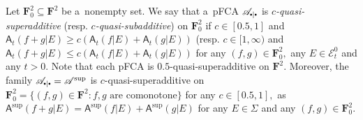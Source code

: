 \documentclass[preprint,11pt]{elsarticle}
\newtheorem{proposition}[tw]{Proposition}
\theoremstyle{definition}
\renewenvironment{proof}[1][\textbf{Proof}]{\noindent\textbf{#1.} }{\hfill\qed\vspace{2.5ex}}
\newcommand\bF{\mathbf{F}} %
\newcommand\bFs{\bF_0^2} %
\newcommand\cE{{\mathcal E}}
\newcommand\sA{\mathsf{A}}
\newcommand\aAd[3][E]{\sA_{#3}(#2|#1)}%
\newcommand\sbullet[1][.5]{\mathbin{\vcenter{\hbox{\scalebox{#1}{$\bullet$}}}}}
\newcommand\bA{\mathscr{A}}%
\newcommand\bpeA{\mathscr {A}_{\sbullet|\sbullet}}%
\newcommand{\bmu}{\boldsymbol{\mu}}
\newcommand\bmub[1][\bpeA]{\bmu_{#1}}
\renewcommand\ge{\geqslant}
\renewcommand\le{\leqslant}
\newcommand{\mI}[1]{\mathbbm{1}_{#1}}%
\newcommand{\tx}{\textstyle{}}
\begin{document}








Let $\bFs\subseteq \bF^2$  be a~nonempty set.
We say that a~pFCA $\bpeA$ is  \textit{$c$-quasi-superadditive}
(resp. \textit{$c$-quasi-subadditive}) on $\bFs$ if $c\in [0.5,1]$ and $\sA_t(f+g|E)\ge c(\sA_t(f|E)+\sA_t(g|E))$  (resp. $c\in[1,\infty)$ and $\sA_t(f+g|E)\le c(\sA_t(f|E)+\sA_t(g|E))$  for any $(f,g)\in\bFs,$  any $E\in \cE_t^0$ and any $t>0.$
Note that each pFCA is $0.5$-quasi-superadditive on $\bF^2.$
Moreover, the family $\bpeA=\bA^{\sup}$ is $c$-quasi-superadditive on $\bFs=\{(f,g)\in \bF^2
\colon f,g\text{ are comonotone}\}$
for any $c\in [0.5,1],$ as $\sA^{\sup}(f+g|E)=\sA^{\sup}(f|E)+\sA^{\sup}(g|E)$ for any $E\in \Sigma$ and any  $(f,g)\in \bF^2_0.$
\end{document}
